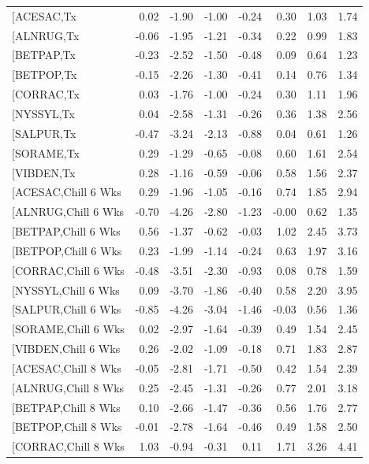 \documentclass{article}\usepackage[]{graphicx}\usepackage[]{color}
\begin{document}
\begin{longtable}{lrrrrrrr}
  [ACESAC,Tx & 0.02 & -1.90 & -1.00 & -0.24 & 0.30 & 1.03 & 1.74 \\ 
  [ALNRUG,Tx & -0.06 & -1.95 & -1.21 & -0.34 & 0.22 & 0.99 & 1.83 \\ 
  [BETPAP,Tx & -0.23 & -2.52 & -1.50 & -0.48 & 0.09 & 0.64 & 1.23 \\ 
  [BETPOP,Tx & -0.15 & -2.26 & -1.30 & -0.41 & 0.14 & 0.76 & 1.34 \\ 
  [CORRAC,Tx & 0.03 & -1.76 & -1.00 & -0.24 & 0.30 & 1.11 & 1.96 \\ 
  [NYSSYL,Tx & 0.04 & -2.58 & -1.31 & -0.26 & 0.36 & 1.38 & 2.56 \\ 
  [SALPUR,Tx & -0.47 & -3.24 & -2.13 & -0.88 & 0.04 & 0.61 & 1.26 \\ 
  [SORAME,Tx & 0.29 & -1.29 & -0.65 & -0.08 & 0.60 & 1.61 & 2.54 \\ 
  [VIBDEN,Tx & 0.28 & -1.16 & -0.59 & -0.06 & 0.58 & 1.56 & 2.37 \\ 
  [ACESAC,Chill 6 Wks & 0.29 & -1.96 & -1.05 & -0.16 & 0.74 & 1.85 & 2.94 \\ 
  [ALNRUG,Chill 6 Wks & -0.70 & -4.26 & -2.80 & -1.23 & -0.00 & 0.62 & 1.35 \\ 
  [BETPAP,Chill 6 Wks & 0.56 & -1.37 & -0.62 & -0.03 & 1.02 & 2.45 & 3.73 \\ 
  [BETPOP,Chill 6 Wks & 0.23 & -1.99 & -1.14 & -0.24 & 0.63 & 1.97 & 3.16 \\ 
  [CORRAC,Chill 6 Wks & -0.48 & -3.51 & -2.30 & -0.93 & 0.08 & 0.78 & 1.59 \\ 
  [NYSSYL,Chill 6 Wks & 0.09 & -3.70 & -1.86 & -0.40 & 0.58 & 2.20 & 3.95 \\ 
  [SALPUR,Chill 6 Wks & -0.85 & -4.26 & -3.04 & -1.46 & -0.03 & 0.56 & 1.36 \\ 
  [SORAME,Chill 6 Wks & 0.02 & -2.97 & -1.64 & -0.39 & 0.49 & 1.54 & 2.45 \\ 
  [VIBDEN,Chill 6 Wks & 0.26 & -2.02 & -1.09 & -0.18 & 0.71 & 1.83 & 2.87 \\ 
  [ACESAC,Chill 8 Wks & -0.05 & -2.81 & -1.71 & -0.50 & 0.42 & 1.54 & 2.39 \\ 
  [ALNRUG,Chill 8 Wks & 0.25 & -2.45 & -1.31 & -0.26 & 0.77 & 2.01 & 3.18 \\ 
  [BETPAP,Chill 8 Wks & 0.10 & -2.66 & -1.47 & -0.36 & 0.56 & 1.76 & 2.77 \\ 
  [BETPOP,Chill 8 Wks & -0.01 & -2.78 & -1.64 & -0.46 & 0.49 & 1.58 & 2.50 \\ 
  [CORRAC,Chill 8 Wks & 1.03 & -0.94 & -0.31 & 0.11 & 1.71 & 3.26 & 4.41 \\ 

\end{longtable}
\end{document}
